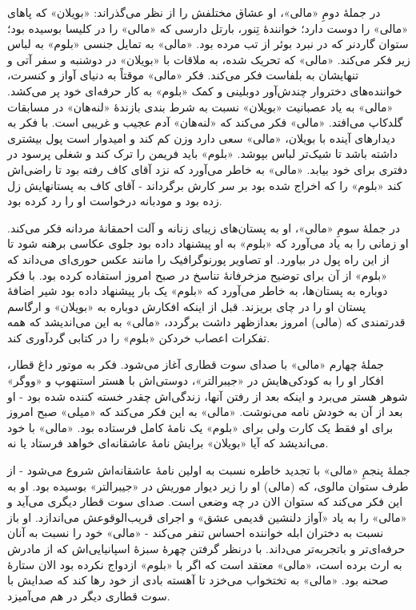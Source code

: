 \documentclass[12pt]{book}
\newcommand{\noun}[1]{«{#1}»}
\begin{document}
    در جملۀ دومِ \noun{مالی}، او عشاق مختلفش را از نظر می‌گذراند: \noun{بویلان} که پاهای \noun{مالی} را دوست دارد؛ خوانندۀ تِنور، بارتل دارسی که \noun{مالی} را در کلیسا بوسیده بود؛ ستوان گاردنر که در نبرد بوئر از تب مرده بود. \noun{مالی} به تمایل جنسی \noun{بلوم} به لباس زیر فکر می‌کند. \noun{مالی} که تحریک شده، به ملاقات با \noun{بویلان} در دوشنبه و سفر آتی و تنهایشان به بلفاست فکر می‌کند. فکر \noun{مالی} موقتاً به دنیای آواز و کنسرت، خواننده‌های دختروار چندش‌آور دوبلینی و کمک \noun{بلوم} به کار حرفه‌ای خود پر می‌کشد. \noun{مالی} به یاد عصبانیت \noun{بویلان} نسبت به شرط بندی بازندۀ \noun{لنه‌هان} در مسابقات گلدکاپ می‌افتد. \noun{مالی} فکر می‌کند که \noun{لنه‌هان} آدم عجیب و غریبی است. با فکر به دیدارهای آینده با بویلان، \noun{مالی} سعی دارد وزن کم کند و امیدوار است پول بیشتری داشته باشد تا شیک‌تر لباس بپوشد. \noun{بلوم} باید فریمن را ترک کند و شغلی پرسود در دفتری برای خود بیابد. \noun{مالی} به خاطر می‌آورد که نزد آقای کاف رفته بود تا راضی‌اش کند \noun{بلوم} را که اخراج شده بود بر سر کارش برگرداند - آقای کاف به پستانهایش زل زده بود و مودبانه درخواست او را رد کرده بود.

    در جملۀ سومِ \noun{مالی}، او به پستان‌های زیبای زنانه و آلت احمقانۀ مردانه فکر می‌کند. او زمانی را به یاد می‌آورد که \noun{بلوم} به او پیشنهاد داده بود جلوی عکاسی برهنه شود تا از این راه پول در بیاورد. او تصاویر پورنوگرافیک را مانند عکس حوری‌ای می‌داند که \noun{بلوم} از آن برای توضیح مزخرفانۀ تناسخ در صبح امروز استفاده کرده بود. با فکر دوباره به پستان‌ها، به خاطر می‌آورد که \noun{بلوم} یک بار پیشنهاد داده بود شیر اضافۀ پستان او را در چای بریزند. قبل از اینکه افکارش دوباره به \noun{بویلان} و ارگاسم قدرتمندی که (مالی) امروز بعدازظهر داشت برگردد، \noun{مالی} به این می‌اندیشد که همه تفکرات اعصاب خردکن \noun{بلوم} را در کتابی گردآوری کند.

    جملۀ چهارم \noun{مالی} با صدای سوت قطاری آغاز می‌شود. فکر به موتور داغ قطار، افکار او را به کودکی‌هایش در \noun{جیبرالتر}، دوستی‌اش با هستر استنهوپ و «ووگر» شوهر هستر می‌برد و اینکه بعد از رفتن آنها، زندگی‌اش چقدر خسته کننده شده بود - او بعد از آن به خودش نامه می‌نوشت. \noun{مالی} به این فکر می‌کند که \noun{میلی} صبح امروز برای او فقط یک کارت ولی برای \noun{بلوم} یک نامۀ کامل فرستاده بود. \noun{مالی} با خود می‌اندیشد که آیا \noun{بویلان} برایش نامۀ عاشقانه‌ای خواهد فرستاد یا نه.

    جملۀ پنجمِ \noun{مالی} با تجدید خاطره نسبت به اولین نامۀ عاشقانه‌اش شروع می‌شود - از طرف ستوان مالوی، که (مالی) او را زیر دیوار موریش در \noun{جیبرالتر} بوسیده بود. او به این فکر می‌کند که ستوان الان در چه وضعی است. صدای سوت قطار دیگری می‌آید و \noun{مالی} را به یاد «آواز دلنشین قدیمی عشق» و اجرای قریب‌الوقوعش می‌اندازد. او باز نسبت به دختران ابله خواننده احساس تنفر می‌کند - \noun{مالی} خود را نسبت به آنان حرفه‌ای‌تر و باتجربه‌تر می‌داند. با درنظر گرفتن چهرۀ سبزۀ اسپانیایی‌اش که از مادرش به ارث برده است، \noun{مالی} معتقد است که اگر با \noun{بلوم} ازدواج نکرده بود الان ستارۀ صحنه بود. \noun{مالی} به تختخواب می‌خزد تا آهسته بادی از خود رها کند که صدایش با سوت قطاری دیگر در هم می‌آمیزد.
\end{document}
